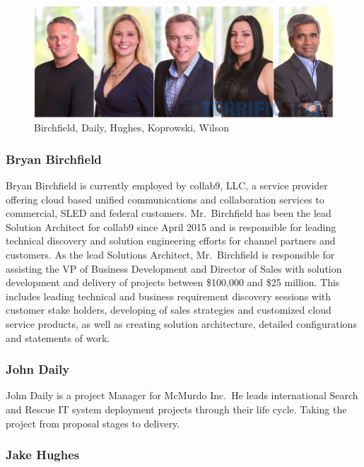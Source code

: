 \documentclass[9pt,]{book}
\begin{document}
\begin{figure}
\centering
\includegraphics{images/p2404232675-5.jpg}
\caption{Birchfield, Daily, Hughes, Koprowski, Wilson}
\end{figure}

\hypertarget{bryan-birchfield}{%
\subsubsection{Bryan Birchfield}\label{bryan-birchfield}}

Bryan Birchfield is currently employed by collab9, LLC, a service
provider offering cloud based unified communications and collaboration
services to commercial, SLED and federal customers. Mr.~Birchfield has
been the lead Solution Architect for collab9 since April 2015 and is
responsible for leading technical discovery and solution engineering
efforts for channel partners and customers. As the lead Solutions
Architect, Mr.~Birchfield is responsible for assisting the VP of
Business Development and Director of Sales with solution development and
delivery of projects between \$100,000 and \$25 million. This includes
leading technical and business requirement discovery sessions with
customer stake holders, developing of sales strategies and customized
cloud service products, as well as creating solution architecture,
detailed configurations and statements of work.

\hypertarget{john-daily}{%
\subsubsection{John Daily}\label{john-daily}}

John Daily is a project Manager for McMurdo Inc.~He leads international
Search and Rescue IT system deployment projects through their life
cycle. Taking the project from proposal stages to delivery.

\hypertarget{jake-hughes}{%
\subsubsection{Jake Hughes}\label{jake-hughes}}
\end{document}

